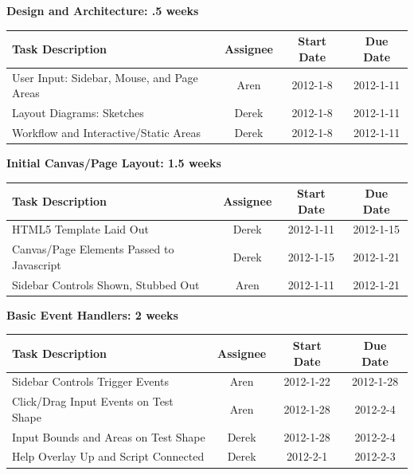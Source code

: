 \documentclass[12pt, letterpaper]{article}
\begin{document}
  \begin{center}
		{\bf Design and Architecture: .5 weeks}
    \begin{tabular}{| p{8.3cm} || c | c | c | }
      \hline
      Task Description & Assignee & Start Date & Due Date \\
      \hline
	    User Input: Sidebar, Mouse, and Page Areas & Aren & 2012-1-8 & 2012-1-11 \\
	    Layout Diagrams: Sketches & Derek & 2012-1-8 & 2012-1-11 \\
	    Workflow and Interactive/Static Areas & Derek & 2012-1-8 & 2012-1-11 \\
      \hline
    \end{tabular}
  \end{center}

  \begin{center}
		{\bf Initial Canvas/Page Layout: 1.5 weeks}
    \begin{tabular}{| p{8.3cm} || c | c | c | }
      \hline
      Task Description & Assignee & Start Date & Due Date \\
      \hline
	    HTML5 Template Laid Out & Derek & 2012-1-11 & 2012-1-15 \\
	    Canvas/Page Elements Passed to Javascript & Derek & 2012-1-15 & 2012-1-21 \\
	    Sidebar Controls Shown, Stubbed Out & Aren & 2012-1-11 & 2012-1-21 \\
      \hline
    \end{tabular}
  \end{center}

  \begin{center}
		{\bf Basic Event Handlers: 2 weeks}
    \begin{tabular}{| p{8.3cm} || c | c | c | }
      \hline
      Task Description & Assignee & Start Date & Due Date \\
      \hline
 	    Sidebar Controls Trigger Events & Aren & 2012-1-22 & 2012-1-28 \\
	    Click/Drag Input Events on Test Shape & Aren & 2012-1-28 & 2012-2-4 \\
	    Input Bounds and Areas on Test Shape & Derek & 2012-1-28 & 2012-2-4 \\
        Help Overlay Up and Script Connected & Derek & 2012-2-1 & 2012-2-3 \\
      \hline
    \end{tabular}
  \end{center}
\end{document}
